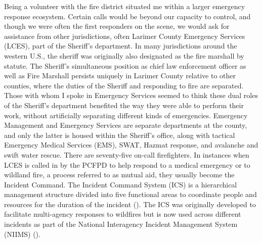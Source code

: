 \documentclass[
]{article}
\begin{document}
Being a volunteer with the fire district situated me within a larger emergency response ecosystem. Certain calls would be beyond our capacity to control, and though we were often the first responders on the scene, we would ask for assistance from other jurisdictions, often Larimer County Emergency Services (LCES), part of the Sheriff's department. In many jurisdictions around the western U.S., the sheriff was originally also designated as the fire marshall by statute. The Sheriff's simultaneous position as chief law enforcement officer as well as Fire Marshall persists uniquely in Larimer County relative to other counties, where the duties of the Sheriff and responding to fire are separated. Those with whom I spoke in Emergency Services seemed to think these dual roles of the Sheriff's department benefited the way they were able to perform their work, without artificially separating different kinds of emergencies. Emergency Management and Emergency Services are separate departments at the county, and only the latter is housed within the Sheriff's office, along with tactical Emergency Medical Services (EMS), SWAT, Hazmat response, and avalanche and swift water rescue. There are seventy-five on-call firefighters. In instances when LCES is called in by the PCFPD to help respond to a medical emergency or to wildland fire, a process referred to as mutual aid, they usually become the Incident Command. The Incident Command System (ICS) is a hierarchical management structure divided into five functional areas to coordinate people and resources for the duration of the incident (). The ICS was originally developed to facilitate multi-agency responses to wildfires but is now used across different incidents as part of the National Interagency Incident Management System (NIIMS) ().
\end{document}
